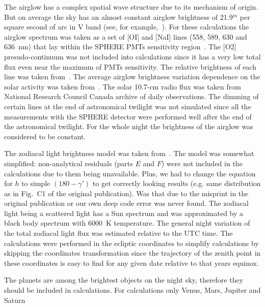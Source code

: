 \documentclass[final,5p,times,twocolumn]{elsarticle}
\begin{document}
The airglow has a complex spatial wave structure due to its mechanism of origin. But on average the sky has an almost constant airglow brightness of 21.9$^m$ per square second of arc in V band (see, for example,~\cite{BENN1998503}). For these calculations the airglow spectrum was taken as a set of [OI] and [NaI] lines (558, 589, 630 and 636~nm) that lay within the SPHERE PMTs sensitivity region~\cite{Ant16}. The [O2] presudo-continuum was not included into calculations since it has a very low total flux even near the maximum of PMTs sensitivity. The relative brightness of each line was taken from~\cite{KRASSOVSKY1962883}. The average airglow brightness variation dependence on the solar activity was taken from~\cite{BENN1998503}. The solar 10.7-cm radio flux was taken from National Research Council Canada archive of daily observations. The dimming of certain lines at the end of astronomical twilight was not simulated since all the measurements with the SPHERE detector were performed well after the end of the astronomical twilight. For the whole night the brightness of the airglow was considered to be constant.

The zodiacal light brightness model was taken from~\cite{BUFFINGTON201688}. The model was somewhat simplified: non-analytical residuals (parts $E$ and $F$) were not included in the calculations due to them being unavailable. Plus, we had to change the equation for $h$ to simple $(180-\gamma')$ to get correctly looking results (e.g. same distribution as in Fig.~C1 of the original publication). Was that due to the misprint in the original publication or our own deep code error was never found. The zodiacal light being a scattered light has a Sun spectrum and was approximated by a black body spectrum with 6000~K temperature. The general night variation of the total zodiacal light flux was estimated relative to the UTC time. The calculations were performed in the ecliptic coordinates  to simplify calculations by skipping the coordinates transformation since the trajectory of the zenith point in these coordinates is easy to find for any given date relative to that years equinox. 

The planets are among the brightest objects on the night sky, therefore they should be included in calculations. For calculations only Venus, Mars, Jupiter and Saturn
\end{document}
